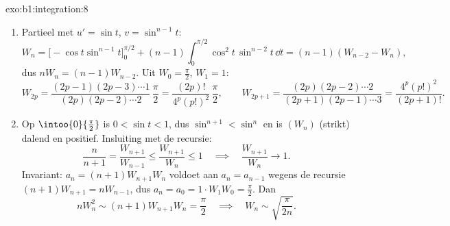 \begin{solution}{exo:b1:integration:8}
\begin{enumerate}
  \item Partieel met $u' = \sin t$, $v = \sin^{n-1} t$:
        \[
        W_n = \bigl[-\cos t\sin^{n-1}t\bigr]_0^{\pi/2}
        + (n-1)\int_0^{\pi/2} \cos^2 t\,\sin^{n-2} t\,\dd t
        = (n-1)(W_{n-2} - W_n),
        \]
        dus $nW_n = (n-1)W_{n-2}$. Uit $W_0 = \frac\pi2$, $W_1 =
        1$:
        \[
        W_{2p} = \frac{(2p-1)(2p-3)\cdots 1}{(2p)(2p-2)\cdots 2}\,
        \frac{\pi}{2} = \frac{(2p)!}{4^p (p!)^2}\,\frac\pi2,
        \qquad
        W_{2p+1} = \frac{(2p)(2p-2)\cdots 2}{(2p+1)(2p-1)\cdots 3}
        = \frac{4^p (p!)^2}{(2p+1)!} .
        \]
  \item Op $\intoo{0}{\frac\pi2}$ is $0 < \sin t < 1$, dus
        $\sin^{n+1} < \sin^n$ en is $(W_n)$ (strikt) dalend en
        positief. Insluiting met de recursie:
        \[
        \frac{n}{n+1} = \frac{W_{n+1}}{W_{n-1}}
        \leq \frac{W_{n+1}}{W_n} \leq 1
        \quad\implies\quad \frac{W_{n+1}}{W_n} \to 1 .
        \]
        Invariant: $a_n = (n+1)W_{n+1}W_n$ voldoet aan $a_n =
        a_{n-1}$ wegens de recursie $(n+1)W_{n+1} = nW_{n-1}$, dus
        $a_n = a_0 = 1 \cdot W_1 W_0 = \frac\pi2$. Dan
        \[
        n W_n^2 \sim (n+1) W_{n+1} W_n = \frac\pi2
        \quad\implies\quad
        W_n \sim \sqrt{\frac{\pi}{2n}} .
        \]
\end{enumerate}
\end{solution}

